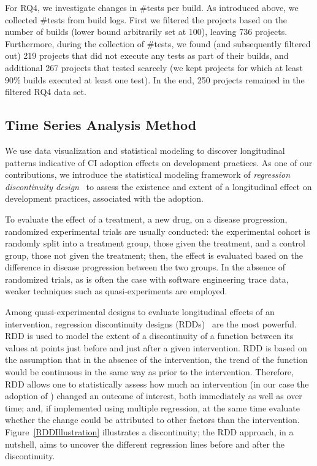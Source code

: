 For RQ4, we investigate changes in \#tests per build.
As introduced above, we collected \#tests from build logs. 
First we filtered the projects based on the number of builds
(lower bound arbitrarily set at 100), leaving 736 projects. 
Furthermore, during the collection of \#tests, we found (and subsequently
filtered out) 219 projects that did not execute any tests as part of their \Tvis 
builds, and additional 267 projects that tested scarcely (\ie we kept 
projects for which at least 90\% builds executed at least one test). 
In the end, 250 projects remained in the filtered RQ4 data set.

\subsection{Time Series Analysis Method}
\label{sec:tsa}

We use data visualization and statistical modeling to discover longitudinal 
patterns indicative of CI adoption effects on development practices.
As one of our contributions, we introduce the statistical modeling 
framework of \emph{regression discontinuity design}~\cite{imbens2008regression} 
to assess the existence and extent of a longitudinal effect on development 
practices, associated with the \Tvis adoption.

To evaluate the effect of a treatment, \eg a new drug, on a disease progression, 
randomized experimental trials are usually conducted: the experimental 
cohort is randomly split into a treatment group, \ie those given the treatment, 
and a control group, \ie those not given the treatment; 
then, the effect is evaluated based on the difference in disease progression 
between the two groups.
In the absence of randomized trials, as is often the case with software 
engineering trace data, weaker techniques such as quasi-experiments are 
employed.

Among quasi-experimental designs to evaluate longitudinal effects of an 
intervention, regression discontinuity designs (RDDs)~\cite{cook1979quasi} 
are the most powerful.
RDD is used to model the extent of a discontinuity of a function between its 
values at points just before and just after a given intervention. 
RDD is based on the assumption that in the absence of the intervention, the 
trend of the function would be continuous in the same way as prior to the 
intervention.
Therefore, RDD allows one to statistically assess how much an intervention 
(in our case the adoption of \Tvis) changed an outcome of interest, both 
immediately as well as over time; and, if implemented using multiple regression, 
at the same time evaluate whether the change could be attributed to other 
factors than the intervention.
Figure~\ref{RDDIllustration} illustrates a discontinuity; the RDD approach, 
in a nutshell, aims to uncover the different regression lines before and after 
the discontinuity.

